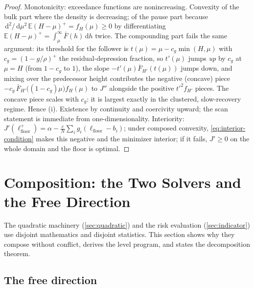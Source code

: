 \documentclass[11pt, a4paper]{article}
\theoremstyle{definition}
\theoremstyle{plain}
\theoremstyle{remark}
\newcommand{\E}{\mathbb{E}}
\newcommand{\dd}{\,\mathrm{d}}
\newcommand{\pos}[1]{\left(#1\right)^{\!+}}
\begin{document}
\begin{proof}
Monotonicity: exceedance functions are nonincreasing.  Convexity of
the bulk part where the density is decreasing; of the pause part
because $\dd^2/\dd\mu^2\,\E\pos{H-\mu} = f_H(\mu) \ge 0$ by
differentiating $\E\pos{H-\mu} = \int_\mu^\infty \bar F(h)\dd h$
twice.  The compounding part fails the same argument: its threshold
for the follower is $t(\mu) = \mu - c_g\min(H,\mu)$ with
$c_g = \pos{1 - g/\rho}$ the residual-depression fraction, so
$t'(\mu)$ jumps \emph{up} by $c_g$ at $\mu = H$ (from $1-c_g$ to
$1$), the slope $-t'(\mu)\bar F_{H'}(t(\mu))$ jumps down, and mixing
over the predecessor height contributes the negative (concave) piece
$-c_g\,\bar F_{H'}\bigl((1-c_g)\mu\bigr) f_H(\mu)$ to $J''$ alongside
the positive $t'^2 f_{H'}$ pieces.  The concave piece scales with
$c_g$: it is largest exactly in the clustered, slow-recovery regime.
Hence (i).  Existence by continuity and coercivity upward; the scan
statement is immediate from one-dimensionality.  Interiority:
$J'(\ell_{\mathrm{floor}}^+) = \alpha -
\tfrac{c}{N}\sum_i g_i(\ell_{\mathrm{floor}} - b_i)$; under composed
convexity, \cref{eq:interior-condition} makes this negative and the
minimizer interior; if it fails, $J' \ge 0$ on the whole domain and
the floor is optimal.
\end{proof}

\section{Composition: the Two Solvers and the Free Direction}
\label{sec:composition}

The quadratic machinery (\cref{sec:quadratic}) and the risk evaluation
(\cref{sec:indicator}) use disjoint mathematics and disjoint statistics.
This section shows why they compose without conflict, derives the level
program, and states the decomposition theorem.

\subsection{The free direction}\label{sec:free-direction}
\end{document}

